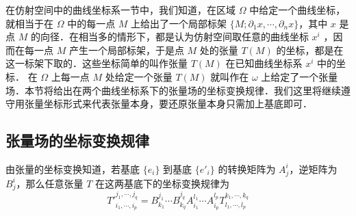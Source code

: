 
在仿射空间中的曲线坐标系一节中，我们知道，在区域 $\Omega$ 中给定一个曲线坐标，就相当于在 $\Omega$ 中的每一点 $M$ 上给出了一个局部标架 $\{M;\partial_1 x,\cdots,\partial_n x\}$，其中 $x$ 是点 $M$ 的向径．在相当多的情形下，都是认为仿射空间取任意的曲线坐标 $x^i$ ，因而在每一点 $M$ 产生一个局部标架，于是点 $M$ 处的张量 $T(M)$ 的坐标，都是在这一标架下取的．这些坐标简单的叫作张量 $T(M)$ 在已知曲线坐标系 $x^i$ 中的坐标． 在 $\Omega$ 上每一点 $M$ 处给定一个张量 $T(M)$ 就叫作在 $\omega$ 上给定了一个张量场．本节将给出在两个曲线坐标系下的张量场的坐标变换规律．我们这里将继续遵守用张量坐标形式来代表张量本身，要还原张量本身只需加上基底即可．

\subsection{张量场的坐标变换规律}
由张量的坐标变换知道，若基底 $\{e_i\}$ 到基底 $\{e'_i\}$ 的转换矩阵为 $A^i_j$，逆矩阵为 $B^i_j$，那么任意张量 $T$ 在这两基底下的坐标变换规律为
\begin{equation}
T'^{j_1,\cdots,j_q}_{i_1,\cdots,i_p}=B^{j_1}_{k_1}\cdots B^{j_q}_{k_q}A^{l_1}_{i_1}\cdots A^{l_p}_{i_p}T^{k_1,\cdots,k_q}_{l_1,\cdots,l_p}
\end{equation}



